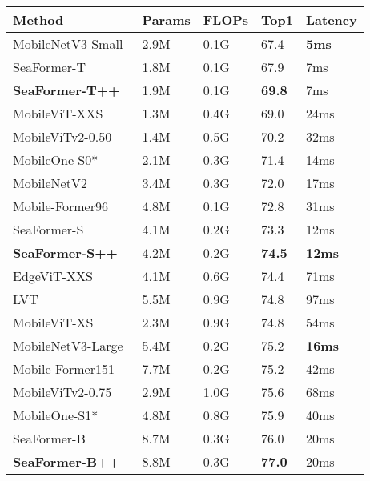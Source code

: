 \begin{table}
\small
\centering

\begin{tabular}{L{4.0cm}|C{1.5cm}|C{1.5cm}|C{1.5cm}|C{1.5cm}}
\hline

\hline

\hline
Method  & Params  &FLOPs & Top1 & Latency\\
\hline

\hline
\hline
MobileNetV3-Small~\cite{howard2019searching}  & 2.9M & 0.1G & 67.4 & \textbf{5ms} \\
SeaFormer-T  & 1.8M & 0.1G & 67.9 & 7ms \\
\textbf{SeaFormer-T++}  & 1.9M & 0.1G & \textbf{69.8} & 7ms \\
\hline

\hline
\hline
MobileViT-XXS~\cite{mehta2021mobilevit}  & 1.3M & 0.4G & 69.0 & 24ms \\
MobileViTv2-0.50~\cite{mehta2022separable} & 1.4M & 0.5G & 70.2 & 32ms \\
MobileOne-S0*~\cite{vasu2022improved} & 2.1M & 0.3G & 71.4 & 14ms \\
MobileNetV2~\cite{sandler2018mobilenetv2} & 3.4M & 0.3G & 72.0 & 17ms \\
Mobile-Former96~\cite{chen2022mobile} & 4.8M & 0.1G & 72.8 & 31ms \\
SeaFormer-S & 4.1M & 0.2G & 73.3 & 12ms \\
\textbf{SeaFormer-S++} & 4.2M & 0.2G & \textbf{74.5} & \textbf{12ms} \\
\hline

\hline
\hline
EdgeViT-XXS~\cite{pan2022edgevits} & 4.1M & 0.6G & 74.4  & 71ms \\
LVT~\cite{yang2022lite} & 5.5M & 0.9G & 74.8 & 97ms \\
MobileViT-XS~\cite{mehta2021mobilevit} & 2.3M & 0.9G & 74.8 & 54ms \\
MobileNetV3-Large~\cite{howard2019searching} & 5.4M & 0.2G & 75.2 & \textbf{16ms} \\
Mobile-Former151~\cite{chen2022mobile} & 7.7M & 0.2G & 75.2 & 42ms \\
MobileViTv2-0.75~\cite{mehta2022separable} & 2.9M & 1.0G & 75.6 & 68ms \\
MobileOne-S1*~\cite{vasu2022improved} & 4.8M & 0.8G & 75.9 & 40ms \\
SeaFormer-B & 8.7M & 0.3G & 76.0 & 20ms \\
\textbf{SeaFormer-B++} & 8.8M & 0.3G & \textbf{77.0} & 20ms \\
\hline


\end{tabular}
\end{table}
